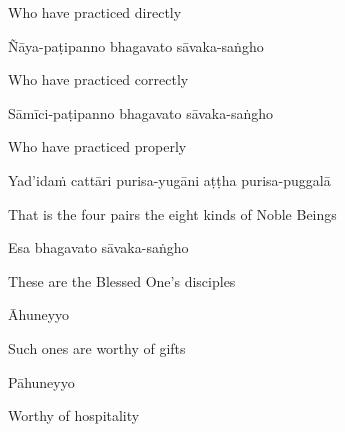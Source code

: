 \begin{english}
  Who have practiced directly\makeatletter\hyperlink{endnote5-appendix}\makeatother

\end{english}

Ñāya-paṭipanno bhagavato sāvaka-saṅgho

\begin{english}
  Who have practiced correctly\ifdigital\makeatletter\hyperlink{endnote6-appendix}\makeatother\fi

\end{english}

Sāmīci-paṭipanno bhagavato sāvaka-saṅgho

\begin{english}
  Who have practiced properly\ifdigital\makeatletter\hyperlink{endnote7-appendix}\makeatother\fi

\end{english}

Yad'idaṁ cattāri purisa-yugāni aṭṭha purisa-puggalā

\begin{english}
  That is the four pairs the eight kinds of Noble Beings
\end{english}

Esa bhagavato sāvaka-saṅgho

\begin{english}
  These are the Blessed One's disciples
\end{english}

Āhuneyyo

\begin{english}
  Such ones are worthy of gifts
\end{english}

\ifninebythirteen\clearpage\fi

Pāhuneyyo

\begin{english}
  Worthy of hospitality
\end{english}

